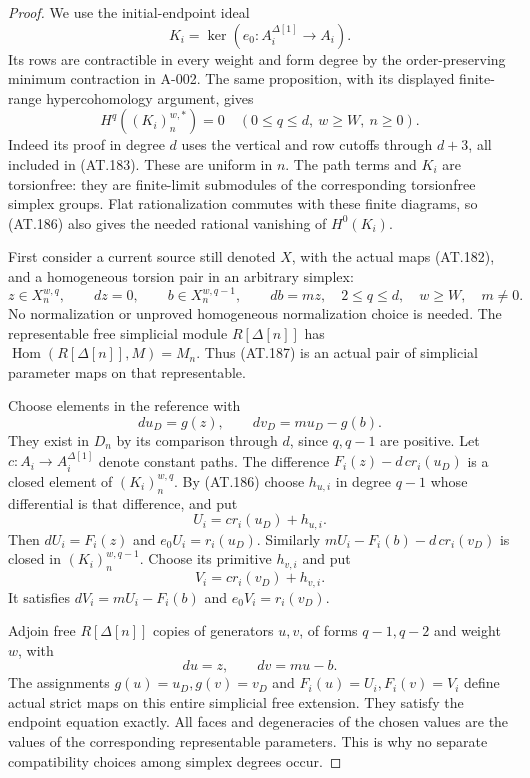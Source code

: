 \begin{proof}
We use the initial-endpoint ideal
\[
                 K_i=\ker(e_0:A_i^{\Delta[1]}\to A_i).
 \tag{AT.185}
\]
Its rows are contractible in every weight and
form degree by the order-preserving minimum
contraction in A-002.
The same proposition, with its displayed
finite-range hypercohomology argument, gives
\[
 H^q((K_i)_n^{w,*})=0
 \quad(0\leq q\leq d,\ w\geq W,\ n\geq0).
 \tag{AT.186}
\]
Indeed its proof in degree $d$ uses the vertical
and row cutoffs through $d+3$, all included in
(AT.183). These are uniform in $n$.
The path terms and $K_i$ are torsionfree:
they are finite-limit submodules of the
corresponding torsionfree simplex groups.
Flat rationalization commutes with these
finite diagrams, so (AT.186) also gives
the needed rational vanishing of $H^0(K_i)$.

First consider a current source still denoted
$X$, with the actual maps (AT.182), and a
homogeneous torsion pair in an arbitrary simplex:
\[
 z\in X_n^{w,q},\qquad dz=0,\qquad
 b\in X_n^{w,q-1},\qquad db=mz,
 \quad 2\leq q\leq d,\quad w\geq W,\quad m\ne0.
 \tag{AT.187}
\]
No normalization or unproved homogeneous
normalization choice is needed.
The representable free simplicial module
$R[\Delta[n]]$ has
$\operatorname{Hom}(R[\Delta[n]],M)=M_n$.
Thus (AT.187) is an actual pair of simplicial
parameter maps on that representable.

Choose elements in the reference with
\[
 du_D=g(z),\qquad dv_D=mu_D-g(b).
 \tag{AT.188}
\]
They exist in $D_n$ by its comparison through
$d$, since $q,q-1$ are positive.
Let $c:A_i\to A_i^{\Delta[1]}$ denote constant paths.
The difference
$F_i(z)-d\,c r_i(u_D)$ is a closed element
of $(K_i)_n^{w,q}$.
By (AT.186) choose $h_{u,i}$ in degree $q-1$
whose differential is that difference, and put
\[
                      U_i=c r_i(u_D)+h_{u,i}.
 \]
Then $dU_i=F_i(z)$ and $e_0U_i=r_i(u_D)$.
Similarly
$mU_i-F_i(b)-d\,c r_i(v_D)$ is closed in
$(K_i)_n^{w,q-1}$.
Choose its primitive $h_{v,i}$ and put
\[
                      V_i=c r_i(v_D)+h_{v,i}.
 \tag{AT.189}
\]
It satisfies $dV_i=mU_i-F_i(b)$ and
$e_0V_i=r_i(v_D)$.

Adjoin free $R[\Delta[n]]$ copies of generators
$u,v$, of forms $q-1,q-2$ and weight $w$, with
\[
                           du=z,\qquad dv=mu-b.
 \tag{AT.190}
\]
The assignments $g(u)=u_D,g(v)=v_D$ and
$F_i(u)=U_i,F_i(v)=V_i$ define actual strict
maps on this entire simplicial free extension.
They satisfy the endpoint equation exactly.
All faces and degeneracies of the chosen values
are the values of the corresponding representable
parameters. This is why no separate compatibility
choices among simplex degrees occur.


\end{proof}
